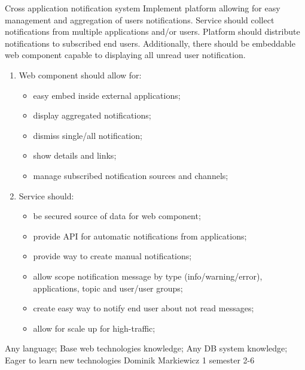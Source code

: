 \begin{project}
{Cross application notification system}
{Implement platform allowing for easy management and aggregation of users notifications. Service should collect notifications from multiple applications and/or users. Platform should distribute notifications to subscribed end users. Additionally, there should be embeddable web component capable to displaying all unread user notification.} 
{
\begin{enumerate}
	\item Web component should allow for:
		\begin{itemize}
			\item easy embed inside external applications;
			\item display aggregated notifications;
			\item dismiss single/all notification;
			\item show details and links;
			\item manage subscribed notification sources and channels;
		\end{itemize}
	\item Service should:
		\begin{itemize}
			\item be secured source of data for web component;
			\item provide API for automatic notifications from applications;
			\item provide way to create manual notifications;
			\item allow scope notification message by type (info/warning/error), applications, topic and user/user groups;
			\item create easy way to notify end user about not read messages;
			\item allow for scale up for high-traffic;
		\end{itemize}
\end{enumerate}
}
{Any language; Base web technologies knowledge; Any DB system knowledge; Eager to learn new technologies}
{Dominik Markiewicz}
{1 semester}
{2-6}
\end{project}

